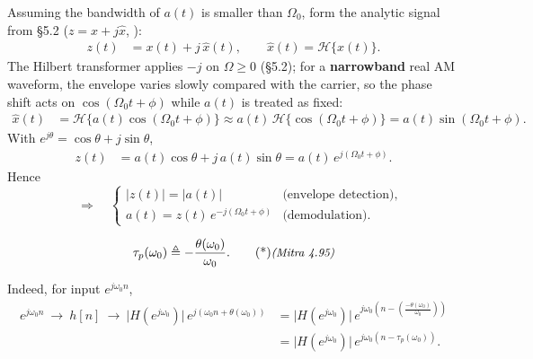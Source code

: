 \documentclass[handout_subfiles_root.tex]{subfiles}
\begin{document}
\begin{examplebox}[breakable, title={\HandoutExampleMitraSecTitle{Example (Amplitude Modulation)}{Sec.~1.2.4}}, handout mark=6]
\noindent Assuming the bandwidth of $a(t)$ is smaller than $\Omega_0$, form the analytic signal from §5.2 ($z=x+j\hat{x}$, ):
\begin{align*}
z(t) &= x(t) + j\,\hat{x}(t), \qquad \hat{x}(t)=\mathcal{H}\{x(t)\}.
\end{align*}
\noindent The Hilbert transformer applies $-j$ on $\Omega\ge 0$ (§5.2); for a \textbf{narrowband} real AM waveform, the envelope varies slowly compared with the carrier, so the phase shift acts on $\cos(\Omega_0 t+\phi)$ while $a(t)$ is treated as fixed:
\begin{align*}
\hat{x}(t) &= \mathcal{H}\bigl\{a(t)\cos(\Omega_0 t+\phi)\bigr\}
\approx a(t)\,\mathcal{H}\bigl\{\cos(\Omega_0 t+\phi)\bigr\}
= a(t)\sin(\Omega_0 t+\phi).
\end{align*}
\noindent With \HandoutEulerMarkLink{} $e^{j\theta}=\cos\theta+j\sin\theta$,
\begin{align*}
z(t) &= a(t)\cos\theta + j\,a(t)\sin\theta
= a(t)\,e^{j(\Omega_0 t+\phi)}.
\end{align*}
\noindent Hence
\begin{equation*}
\quad\Longrightarrow\quad
\begin{cases}
|z(t)| = |a(t)| & \text{(envelope detection)}, \\[2pt]
a(t) = z(t)\,e^{-j(\Omega_0 t+\phi)} & \text{(demodulation)}.
\end{cases}
\end{equation*}
\end{examplebox}


\begin{defbox}[title={Phase Delay}]
\begin{equation*}
\tau_p(\omega_0) \triangleq -\frac{\theta(\omega_0)}{\omega_0}. \MitraTag{4.95}
\end{equation*}
\end{defbox}
Indeed, for input $e^{j\omega_0 n}$,
\begin{align*}
e^{j\omega_0 n} \ \to\ \boxed{h[n]}\ \to\ \big|H(e^{j\omega_0})\big|\,e^{j(\omega_0 n + \theta(\omega_0))}
&= \big|H(e^{j\omega_0})\big|\,e^{j\omega_0\left(n-\left(\frac{-\theta(\omega_0)}{\omega_0}\right)\right)} \\
&= \big|H(e^{j\omega_0})\big|\,e^{j\omega_0\left(n-\tau_p(\omega_0)\right)}.
\end{align*}
\end{document}
